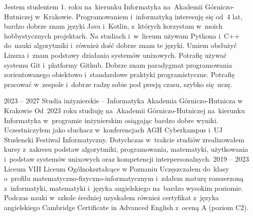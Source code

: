 \documentclass[8pt]{developercv} %
\begin{document}
\begin{minipage}[t]{0.5\textwidth} %
  \vspace{-\baselineskip} %
  Jestem studentem 1. roku na~kierunku Informatyka na~Akademii Górniczo-Hutniczej w~Krakowie.
  Programowaniem i~informatyką interesuję się od~4 lat, bardzo dobrze znam języki
  Java i~Kotlin, z~których korzystam w~moich hobbystycznych projektach.
  Na studiach i~w~liceum używam Pythona i~C++ do~nauki algorytmiki
  i~również dość dobrze znam te języki.
  Umiem obsłużyć Linuxa i~znam podstawy działania systemów unixowych.
  Potrafię używać systemu Git i~platformy Github.
  Dobrze znam paradygmat programowania zorientowanego obiektowo i~standardowe praktyki programistyczne.
  Potrafię pracować w~zespole i~dobrze radzę sobie pod presją czasu, szybko się~uczę.

\end{minipage}
\hfill %
\begin{minipage}[t]{0.45\textwidth} %
	\vspace{-\baselineskip}
	\begin{barchart}{5.5}
	\end{barchart}
\end{minipage}





\begin{entrylist}
  \entry
    {2023 -- 2027}
    {Studia inżynierskie -- Informatyka}
    {Akademia Górniczo-Hutnicza w Krakowie}
    {
      Od~2023 roku studiuję na~Akademii Górniczo-Hutniczej na~kierunku Informatyka w~programie inżynierskim osiągając bardzo dobre wyniki.
      Uczestniczyłem jako słuchacz w~konferencjach AGH Cyberkampus i~UJ Studencki Festiwal Informatyczny.
      Dotychczas w~trakcie studiów zrealizowałem kursy z~zakresu podstaw algorytmiki, programowania, matematyki, użytkowania i~podstaw systemów unixowych oraz kompetencji interpersonalnych.
    }
  \entry
    {2019 -- 2023}
    {Liceum}
    {VIII Liceum Ogólnokształcące w Poznaniu}
    {
      Uczęszczałem do~klasy o~profilu matematyczno-fizyczno-informatycznym i~zdałem maturę rozszerzoną z~informatyki, matematyki i~języka angielskiego na~bardzo wysokim poziomie.
      Podczas nauki w~szkole średniej uzyskałem również certyfikat z~języka angielskiego Cambridge Certificate in Advanced English z~oceną A (poziom C2).
    }
\end{entrylist}
\end{document}
